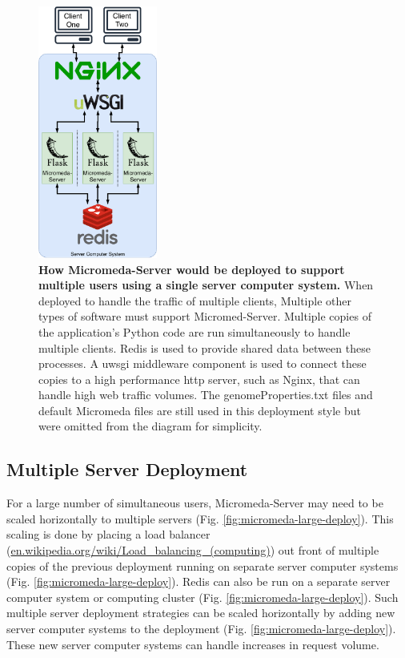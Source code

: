 \begin{figure}[!ht]
  \centering
	\includegraphics[width=0.35\textwidth]{media/micromeda-medium-deployment.pdf}
	 \caption[How Micromeda-Server would be deployed to support multiple users 
using a single server computer system.]{\textbf{How Micromeda-Server would be 
deployed to support multiple users using a single server computer system.} When 
deployed to handle the traffic of multiple clients, Multiple other types of 
software must support Micromed-Server. Multiple copies of the application's 
Python code are run simultaneously to handle multiple clients. Redis is used to 
provide shared data between these processes. A \gls{uwsgi} middleware component 
is used to connect these copies to a high performance \gls{http} server, such as 
Nginx, that can handle high web traffic volumes. The genomeProperties.txt files 
and default Micromeda files are still used in this deployment style but were 
omitted from the diagram for simplicity.}
	 \label{fig:micromeda-medium-deploy}
\end{figure}

\subsection{Multiple Server Deployment} 
\label{multi-server-micromeda-deployment}

For a large number of simultaneous users, Micromeda-Server may need to be scaled 
horizontally to multiple servers (Fig. \ref{fig:micromeda-large-deploy}). This 
scaling is done by placing a load balancer 
(\href{http://en.wikipedia.org/wiki/Load_balancing_(computing)}{en.wikipedia.org/wiki/Load\_balancing\_(computing)}) 
out front of multiple copies of the previous deployment running on separate 
server computer systems (Fig. \ref{fig:micromeda-large-deploy}). Redis can also 
be run on a separate server computer system or computing cluster (Fig. 
\ref{fig:micromeda-large-deploy}). Such multiple server deployment strategies 
can be scaled horizontally by adding new server computer systems to the 
deployment (Fig. \ref{fig:micromeda-large-deploy}). These new server computer 
systems can handle increases in request volume.

